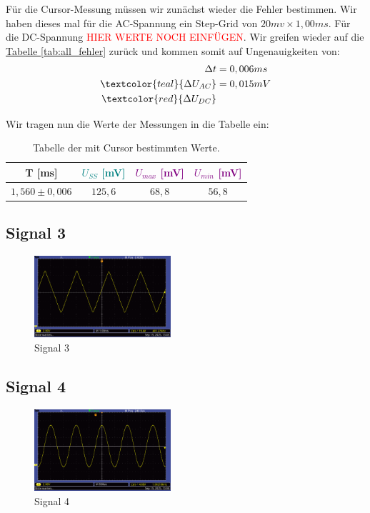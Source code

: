 Für die Cursor-Messung müssen wir zunächst wieder die Fehler bestimmen. Wir haben dieses mal für die AC-Spannung ein Step-Grid von $20mv \times 1,00ms$. Für die DC-Spannung \textcolor{red}{HIER WERTE NOCH EINFÜGEN}. Wir greifen wieder auf die \hyperref[tab:all_fehler]{Tabelle \ref*{tab:all_fehler}} zurück und kommen somit auf Ungenauigkeiten von:
\begin{align}
    \Delta t &= 0,006 ms \\
    \textcolor{teal}{\Delta U_{AC}} &=0,015 mV \\
    \textcolor{red}{\Delta U_{DC}}
\end{align}

Wir tragen nun die Werte der Messungen in die Tabelle ein:
\begin{table}[h!]
    \centering
    \begin{tabular}{c | c | c | c }
        \toprule
        T [ms] & \textcolor{teal}{$U_{SS}$ [mV]} & \textcolor{purple}{$U_{max}$ [mV]} & \textcolor{purple}{$U_{min}$ [mV]} \\
        \hline
        $1,560 \pm 0,006 $ & $125,6$ & $68,8$ & $56,8$ \\
        \bottomrule
    \end{tabular}
    \caption{Tabelle der mit Cursor bestimmten Werte. }
    \label{tab:sig1_cursor}
\end{table}

\newpage
\onecolumn
\twocolumn

\subsection*{Signal 3}
\begin{figure} [h!]
    \centering
        \includegraphics[width=0.45\textwidth]{img/25/Signale2/Signal3.pdf}
    \caption{Signal 3}
\end{figure}

\subsection*{Signal 4}
\begin{figure} [h!]
    \centering
        \includegraphics[width=0.45\textwidth]{img/25/Signale2/Signal4.pdf}
    \caption{Signal 4}
\end{figure}

